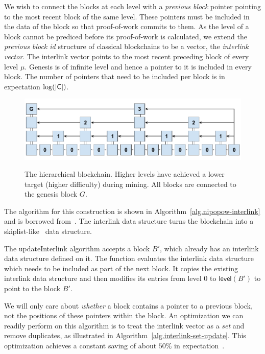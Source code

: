 We wish to connect the blocks at each level with a \emph{previous block}
pointer pointing to the most recent block of the same level. These pointers must
be included in the data of the block so that proof-of-work commits to them. As
the level of a block cannot be prediced before its proof-of-work is calculated,
we extend the \emph{previous block id} structure of classical blockchains to be
a vector, the \emph{interlink vector}. The interlink vector
points to the most recent preceding block of every level $\mu$. Genesis is of
infinite level and hence a pointer to it is included in every block. The number
of pointers that need to be included per block is in expectation
$\log(|\mathsf{C}|)$.

\begin{figure}
    \caption{The hierarchical blockchain.
    Higher levels have achieved a lower target (higher difficulty) during
    mining. All blocks are connected to the genesis block $G$.}
    \centering
    \includegraphics[width=0.7\columnwidth,keepaspectratio]{chapters/work/figures/hierarchical-ledger.png}
    \label{fig.hierarchy}
\end{figure}

The algorithm for this construction is shown in
Algorithm~\ref{alg.nipopow-interlink} and is borrowed from~\cite{popow}. The
interlink data structure turns the blockchain into a
skiplist-like~\cite{skiplist} data structure.

The updateInterlink algorithm accepts a block $B'$, which already has an
interlink data structure defined on it. The function evaluates the
interlink data structure which needs to be included as part of the next block.
It copies the existing interlink data structure and
then modifies its entries from level $0$ to $\textsf{level}(B')$ to
point to the block $B'$.



We will only care about \emph{whether} a block contains a pointer to a previous
block, not the positions of these pointers within the block.
An optimization we can readily perform on this algorithm is to treat the
interlink vector as a \emph{set} and remove duplicates, as illustrated in
Algorithm~\ref{alg.interlink-set-update}. This optimization achieves a constant
saving of about $50\%$ in expectation~\cite{compactsuperblocks}.

